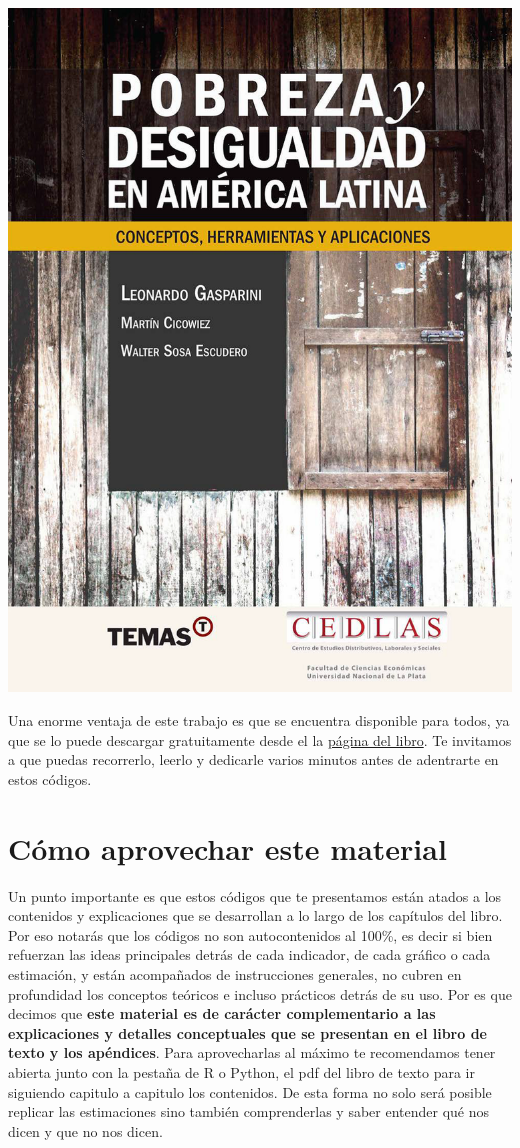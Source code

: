 \documentclass[
]{book}
\begin{document}
\begin{center}\includegraphics[width=0.6\linewidth]{portada_libro} \end{center}

Una enorme ventaja de este trabajo es que se encuentra disponible para todos, ya que se lo puede descargar gratuitamente desde el la \href{https://www.cedlas.econo.unlp.edu.ar/wp/publicaciones/libros/pobreza-y-desigualdad-en-america-latina/}{página del libro}. Te invitamos a que puedas recorrerlo, leerlo y dedicarle varios minutos antes de adentrarte en estos códigos.

\hypertarget{cuxf3mo-aprovechar-este-material}{%
\section*{Cómo aprovechar este material}\label{cuxf3mo-aprovechar-este-material}}

Un punto importante es que estos códigos que te presentamos están atados a los contenidos y explicaciones que se desarrollan a lo largo de los capítulos del libro. Por eso notarás que los códigos no son autocontenidos al 100\%, es decir si bien refuerzan las ideas principales detrás de cada indicador, de cada gráfico o cada estimación, y están acompañados de instrucciones generales, no cubren en profundidad los conceptos teóricos e incluso prácticos detrás de su uso. Por es que decimos que \textbf{este material es de carácter complementario a las explicaciones y detalles conceptuales que se presentan en el libro de texto y los apéndices}. Para aprovecharlas al máximo te recomendamos tener abierta junto con la pestaña de R o Python, el pdf del libro de texto para ir siguiendo capitulo a capitulo los contenidos. De esta forma no solo será posible replicar las estimaciones sino también comprenderlas y saber entender qué nos dicen y que no nos dicen.
\end{document}
